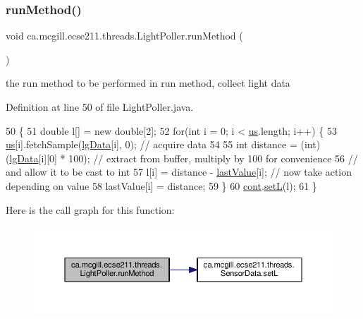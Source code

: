 \subsubsection{\texorpdfstring{run\+Method()}{runMethod()}}
{\footnotesize\ttfamily void ca.\+mcgill.\+ecse211.\+threads.\+Light\+Poller.\+run\+Method (\begin{DoxyParamCaption}{ }\end{DoxyParamCaption})\hspace{0.3cm}{\ttfamily [protected]}}

the run method to be performed in run method, collect light data 

Definition at line 50 of file Light\+Poller.\+java.


\begin{DoxyCode}
50                              \{
51     \textcolor{keywordtype}{double} l[] = \textcolor{keyword}{new} \textcolor{keywordtype}{double}[2];
52     \textcolor{keywordflow}{for}(\textcolor{keywordtype}{int} i = 0; i < \hyperlink{classca_1_1mcgill_1_1ecse211_1_1threads_1_1_light_poller_ab6a9cb770bbf71f586697633db1475ff}{us}.length; i++) \{
53       \hyperlink{classca_1_1mcgill_1_1ecse211_1_1threads_1_1_light_poller_ab6a9cb770bbf71f586697633db1475ff}{us}[i].fetchSample(\hyperlink{classca_1_1mcgill_1_1ecse211_1_1threads_1_1_light_poller_a6cf53aecc3efc481f71d36341d2276c6}{lgData}[i], 0); \textcolor{comment}{// acquire data}
54   
55       \textcolor{keywordtype}{int} distance = (int) (\hyperlink{classca_1_1mcgill_1_1ecse211_1_1threads_1_1_light_poller_a6cf53aecc3efc481f71d36341d2276c6}{lgData}[i][0] * 100); \textcolor{comment}{// extract from buffer, multiply by 100 for
       convenience}
56                                               \textcolor{comment}{// and allow it to be cast to int}
57       l[i] = distance - \hyperlink{classca_1_1mcgill_1_1ecse211_1_1threads_1_1_light_poller_a79908bf56395ae82ab5ac57b5b40f206}{lastValue}[i]; \textcolor{comment}{// now take action depending on value}
58       lastValue[i] = distance; 
59     \}
60     \hyperlink{classca_1_1mcgill_1_1ecse211_1_1threads_1_1_light_poller_ab6a9050ced4f6940add4735c8872194a}{cont}.\hyperlink{classca_1_1mcgill_1_1ecse211_1_1threads_1_1_sensor_data_af905a6f2825716ae1a39bf7f6be09477}{setL}(l);
61   \}
\end{DoxyCode}
Here is the call graph for this function\+:
\nopagebreak
\begin{figure}[H]
\begin{center}
\leavevmode
\includegraphics[width=350pt]{classca_1_1mcgill_1_1ecse211_1_1threads_1_1_light_poller_aab90a460a4d0c926fb8f3930492a8fb1_cgraph}
\end{center}
\end{figure}


